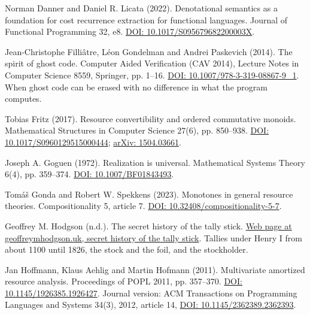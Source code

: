 \documentclass[11pt,twoside]{article}
\theoremstyle{thielethm}
\theoremstyle{thieledef}
\theoremstyle{thieledef}
\theoremstyle{thieledef}
\theoremstyle{thielethm}
\theoremstyle{thieleobs}
\theoremstyle{thielethm}
\begin{document}
\noindent Norman Danner and Daniel R. Licata (2022). Denotational semantics as a foundation for cost recurrence extraction for functional languages. Journal of Functional Programming 32, e8. \href{https://doi.org/10.1017/S095679682200003X}{DOI: 10.1017/S095679682200003X}.
\par\medskip

\noindent Jean-Christophe Filli\^atre, L\'eon Gondelman and Andrei Paskevich (2014). The spirit of ghost code. Computer Aided Verification (CAV 2014), Lecture Notes in Computer Science 8559, Springer, pp. 1--16. \href{https://doi.org/10.1007/978-3-319-08867-9_1}{DOI: 10.1007/978-3-319-08867-9\_1}. When ghost code can be erased with no difference in what the program computes.
\par\medskip

\noindent Tobias Fritz (2017). Resource convertibility and ordered commutative monoids. Mathematical Structures in Computer Science 27(6), pp. 850--938. \href{https://doi.org/10.1017/S0960129515000444}{DOI: 10.1017/S0960129515000444}; \href{https://arxiv.org/abs/1504.03661}{arXiv: 1504.03661}.
\par\medskip

\noindent Joseph A. Goguen (1972). Realization is universal. Mathematical Systems Theory 6(4), pp. 359--374. \href{https://doi.org/10.1007/BF01843493}{DOI: 10.1007/BF01843493}.
\par\medskip

\noindent Tom\'a\v{s} Gonda and Robert W. Spekkens (2023). Monotones in general resource theories. Compositionality 5, article 7. \href{https://doi.org/10.32408/compositionality-5-7}{DOI: 10.32408/compositionality-5-7}.
\par\medskip

\noindent Geoffrey M. Hodgson (n.d.). The secret history of the tally stick. \href{https://www.geoffreymhodgson.uk/secret-history-of-tally-stick}{Web page at geoffreymhodgson.uk, secret history of the tally stick}. Tallies under Henry I from about 1100 until 1826, the stock and the foil, and the stockholder.
\par\medskip

\noindent Jan Hoffmann, Klaus Aehlig and Martin Hofmann (2011). Multivariate amortized resource analysis. Proceedings of POPL 2011, pp. 357--370. \href{https://doi.org/10.1145/1926385.1926427}{DOI: 10.1145/1926385.1926427}. Journal version: ACM Transactions on Programming Languages and Systems 34(3), 2012, article 14, \href{https://doi.org/10.1145/2362389.2362393}{DOI: 10.1145/2362389.2362393}.
\par\medskip
\end{document}
